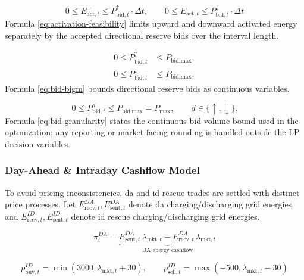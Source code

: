 \begin{equation}\label{eq:activation-feasibility}
    0 \leq E_{\text{act}, t}^{+} \leq P_{\text{bid}, t}^{\uparrow}\cdot\Delta t,
    \qquad
    0 \leq E_{\text{act}, t}^{-} \leq P_{\text{bid}, t}^{\downarrow}\cdot\Delta t
\end{equation}
Formula \ref{eq:activation-feasibility} limits upward and downward activated energy separately by the accepted directional reserve bids over the interval length.

\begin{equation}\label{eq:bid-bigm}
    \begin{aligned}
        0 \leq P_{\text{bid}, t}^{\uparrow}   & \leq P_{\text{bid,max}},     \\
        0 \leq P_{\text{bid}, t}^{\downarrow} & \leq P_{\text{bid,max}}.
    \end{aligned}
\end{equation}
Formula \ref{eq:bid-bigm} bounds directional reserve bids as continuous variables.

\begin{equation}\label{eq:bid-granularity}
    0 \leq P_{\text{bid},t}^{d} \leq P_{\text{bid,max}} = P_{\text{max}},
    \qquad d\in\{\uparrow,\downarrow\}.
\end{equation}
Formula \ref{eq:bid-granularity} states the continuous bid-volume bound used in the optimization; any reporting or market-facing rounding is handled outside the LP decision variables.

\subsubsection{Day-Ahead \& Intraday Cashflow Model}
To avoid pricing inconsistencies, \gls{da} and \gls{id} rescue trades are settled with distinct price processes. Let
$E^{DA}_{\mathrm{recv},t},E^{DA}_{\mathrm{sent},t}$ denote \gls{da} charging/discharging grid energies, and
$E^{ID}_{\mathrm{recv},t},E^{ID}_{\mathrm{sent},t}$ denote \gls{id} rescue charging/discharging grid energies.

\begin{equation}\label{eq:pi-da}
    \pi^{DA}_t
    =
    \underbrace{E^{DA}_{\mathrm{sent},t}\,\lambda_{\text{mkt},t}
        -
        E^{DA}_{\mathrm{recv},t}\,\lambda_{\text{mkt},t}}_{\text{DA energy cashflow}}
\end{equation}

\begin{equation}\label{eq:id-prices}
    p^{ID}_{\mathrm{buy},t}=\min\!\left(3000,\lambda_{\text{mkt},t}+30\right),
    \qquad
    p^{ID}_{\mathrm{sell},t}=\max\!\left(-500,\lambda_{\text{mkt},t}-30\right)
\end{equation}

